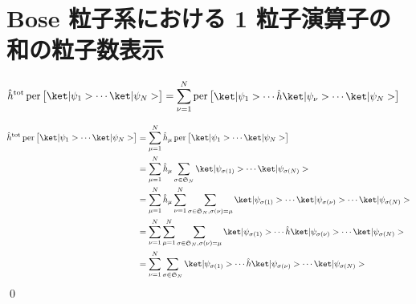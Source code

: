 \documentclass[uplatex,dvipdfmx,a4paper,11pt]{jlreq}
\makeatletter
\DeclareMathOperator{\per}{per}
\renewcommand{\SS}{\mathfrak{S}}
\numberwithin{equation}{section}
\theoremstyle{definition}
\renewenvironment{proof}[1][\proofname]{\par
  \normalfont
  \topsep6\p@\@plus6\p@ \trivlist
  \item[\hskip\labelsep{\bfseries #1}\@addpunct{\bfseries}]\ignorespaces\quad\par
}{%
  \qed\endtrivlist\@endpefalse
}
\renewcommand\proofname{証明}
\makeatother
\begin{document}
\section{Bose 粒子系における 1 粒子演算子の和の粒子数表示}
\begin{proposition}
  \begin{align}
    \hat{h}^{\mathrm{tot}}\per\begin{bmatrix}\ket|\psi_1>\cdots\ket|\psi_N>\end{bmatrix} & = \sum_{\nu = 1}^{N}\per\begin{bmatrix}\ket|\psi_1>\cdots\hat{h}\ket|\psi_{\nu}>\cdots\ket|\psi_N>\end{bmatrix}
  \end{align}
\end{proposition}
\begin{proof}
  \begin{align}
    \hat{h}^{\mathrm{tot}}\per\begin{bmatrix}\ket|\psi_1>\cdots\ket|\psi_N>\end{bmatrix} & = \sum_{\mu = 1}^{N}\hat{h}_\mu\per\begin{bmatrix}\ket|\psi_1>\cdots\ket|\psi_N>\end{bmatrix}                                                                             \\
                                                                                         & = \sum_{\mu = 1}^{N}\hat{h}_\mu\sum_{\sigma\in\SS_N}\ket|\psi_{\sigma(1)}>\cdots\ket|\psi_{\sigma(N)}>                                                                    \\
                                                                                         & = \sum_{\mu = 1}^{N}\hat{h}_\mu\sum_{\nu = 1}^{N}\sum_{\sigma\in\SS_N, \sigma(\nu) = \mu}\ket|\psi_{\sigma(1)}>\cdots\ket|\psi_{\sigma(\nu)}>\cdots\ket|\psi_{\sigma(N)}> \\
                                                                                         & = \sum_{\nu = 1}^{N}\sum_{\mu = 1}^{N}\sum_{\sigma\in\SS_N, \sigma(\nu) = \mu}\ket|\psi_{\sigma(1)}>\cdots\hat{h}\ket|\psi_{\sigma(\nu)}>\cdots\ket|\psi_{\sigma(N)}>     \\
                                                                                         & = \sum_{\nu = 1}^{N}\sum_{\sigma\in\SS_N}\ket|\psi_{\sigma(1)}>\cdots\hat{h}\ket|\psi_{\sigma(\nu)}>\cdots\ket|\psi_{\sigma(N)}>                                          \\

\end{align}
\end{proof}
\end{document}
